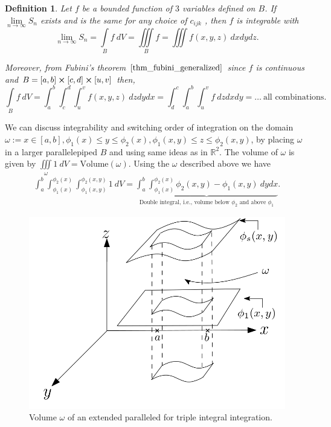 \documentclass[
	12pt,
	]{article}
\newcommand{\R}{\mathbb{R}}
\theoremstyle{custom}
\theoremstyle{custom}
\theoremstyle{custom}
\theoremstyle{custom}
\newtheorem{definition}{Definition}[section]
\theoremstyle{custom}
\theoremstyle{definition}
\theoremstyle{example}
\theoremstyle{note}
\theoremstyle{remark}
\theoremstyle{example}
\newcounter{theo}[section]\setcounter{theo}{0}
\numberwithin{equation}{subsection}
\begin{document}
  			\begin{definition}
  				Let $f$ be a bounded function of $3$ variables defined on $B$. If $\lim\limits_{n\to \infty}S_{n}$ exists and is the same for any choice of $c_{ijk}$ , then $f$ is integrable  with 
  				\begin{equation} 
  				\lim\limits_{n\to \infty}S_{n} = \int\limits_B f \ dV = \iiint\limits_B f = \iiint f(x,y,z) \ dxdydz.
  				\end{equation}
  				
  				Moreover, from Fubini's theorem $\eqref{thm_fubini_generalized}$ since $f$ is continuous and $B = [a,b] \cross [c,d] \cross[u,v]$ then,
  				\begin{equation} 
  				\int\limits_B f \ dV = \int_{a}^{b} \int_{c}^{d}\int_{u}^{v} f(x,y,z) \ dzdydx = \int_{d}^{c} \int_{a}^{b} \int_{u}^{v} f \ dzdxdy = \dots \  \text{all combinations.}
  				\end{equation}
  			\end{definition}
  			 
  			 \noindent We can discuss integrability and switching order of integration on the domain \\$\omega := x\in [a,b] , \phi_{1}(x) \le y \le \phi_{2}(x), \phi_{1}(x,y) \le z \le \phi_{2}(x,y)$, by placing $\omega$ in a larger parallelepiped $B$ and using same ideas as in $\R^{2}$. 
  			 The volume of $\omega$ is given by $\iiint\limits_\omega 1 \ dV = \text{Volume}(\omega)$.
  			 Using the $\omega$ described above we have 
  			 \begin{gather*}
  			 	\int_{a}^{b} \int_{\phi_{1}(x)}^{\phi_{2}(x)} \int_{\phi_{1}(x,y)}^{\phi_{2}(x,y)} 1 \ dV = \underbrace{\int_{a}^{b} \int_{\phi_{1}(x)}^{\phi_{2}(x)} \phi_{2}(x,y) - \phi_{1}(x,y) \ dydx}_{\text{Double integral, i.e., volume below $\phi_{2}$ and above $\phi_{1}$}}.
  			 \end{gather*}
	  			 \begin{figure}[H]
  			 		\centering
  			 		\includegraphics[width=0.5\linewidth]{MATH314_Notes_Triple_Integral_Figure.png}
  			 		\captionsetup{margin=1cm, justification=raggedright}\caption{Volume $\omega$ of an extended paralleled for triple integral integration.}
  			 \end{figure}
  			
\end{document}
